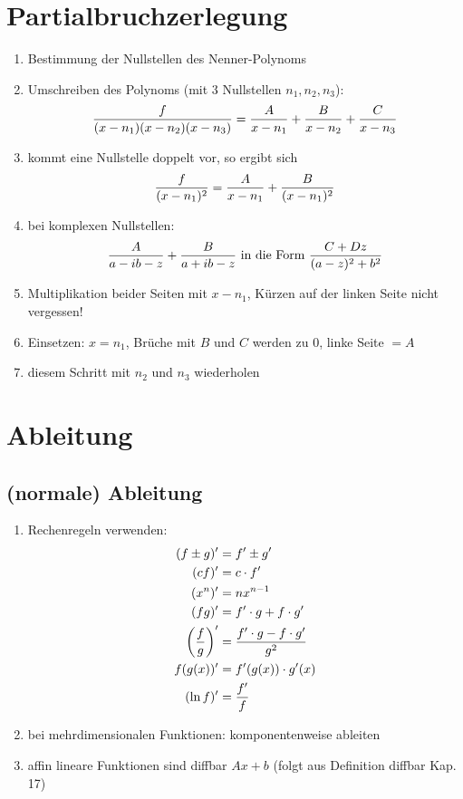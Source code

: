 \documentclass[ngerman,a4paper]{article}
\begin{document}
\section{Partialbruchzerlegung}
\begin{enumerate}[label=\textbf{\arabic*.}]
	\item Bestimmung der Nullstellen des Nenner-Polynoms
	\item Umschreiben des Polynoms (mit 3 Nullstellen $n_1,n_2,n_3$):
	\begin{align}
		\frac{f}{(x-n_1)(x-n_2)(x-n_3)}=\frac{A}{x-n_1}+\frac{B}{x-n_2}+\frac{C}{x-n_3}\notag
	\end{align}
	\item kommt eine Nullstelle doppelt vor, so ergibt sich
	\begin{align}
		\frac{f}{(x-n_1)^2}=\frac{A}{x-n_1}+\frac{B}{(x-n_1)^2}\notag
	\end{align}
	\item bei komplexen Nullstellen:
	\begin{align}
		\frac{A}{a-ib-z}+\frac{B}{a+ib-z} \text{ in die Form } \frac{C+Dz}{(a-z)^2+b^2}\notag
	\end{align}
	\item Multiplikation beider Seiten mit $x-n_1$, Kürzen auf der linken Seite nicht vergessen!
	\item Einsetzen: $x=n_1$, Brüche mit $B$ und $C$ werden zu 0, linke Seite $= A$
	\item diesem Schritt mit $n_2$ und $n_3$ wiederholen
\end{enumerate}

\section{Ableitung}
\subsection{(normale) Ableitung}
\begin{enumerate}[label=\textbf{\arabic*.}]
	\item Rechenregeln verwenden:
	\begin{align}
		(f\pm g)' &= f'\pm g'\notag \\
		(cf)' &= c\cdot f'\notag \\
		(x^n)' &= nx^{n-1}\notag \\
		(fg)' &= f'\cdot g + f\cdot g' \notag \\
		\left(\frac{f}{g}\right)' &= \frac{f'\cdot g-f\cdot g'}{g^2}\notag \\
		f(g(x))' &= f'(g(x))\cdot g'(x)\notag \\
		(\ln f)' &= \frac{f'}{f}\notag
	\end{align}
	\item bei mehrdimensionalen Funktionen: komponentenweise ableiten
	\item affin lineare Funktionen sind diffbar $Ax+b$ (folgt aus Definition diffbar Kap. 17)
\end{enumerate}
\end{document}

